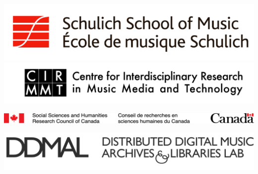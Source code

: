 \documentclass[final]{beamer}
\begin{document}
\begin{frame}[fragile,t]
\begin{minipage}[t][.8\textheight]{\textwidth}
\begin{columns}
\begin{column}{0.95\textwidth}
\begin{block}{}
\begin{columns}
\begin{column}{0.47\textwidth}
            \begin{block}{}
                \centering
                \hspace{-2.5cm}
                \hspace{2.4cm} 
                \includegraphics[scale=0.5]{images/Schulich_logo}
                \hspace{1.8cm} 
                \includegraphics[scale=0.16]{images/CIRMMT_logo}

                \vspace{0.6cm}
                \hspace{-2.5cm}
                \includegraphics[scale=1.47]{images/SSHRC_logo}
                \vspace{0.2cm}

                \hspace{-2.5cm}
                \includegraphics[scale=0.3]{images/ddmal_logo_large}
                \hspace{1.3cm}
            \end{block}
        \end{column}
        \end{columns}
        \end{block}


\end{column}
\end{columns}
\end{minipage}
\end{frame}
\end{document}
